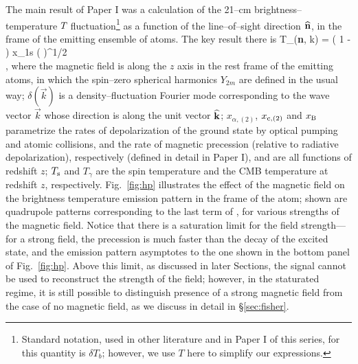 The main result of Paper I was a calculation of the 21--cm brightness--temperature $T_{\rm }$ fluctuation\footnote{Standard notation, used in other literature and in Paper I of this series, for this quantity is $\delta T_b$; however, we use $T$ here to simplify our expressions.} as a function of the line--of--sight direction ${\bf{\widehat n}}$, in the frame of the emitting ensemble of atoms. The key result there is
\beq
\bga
   T_{\rm }({\bf{\widehat n}}, {{\vec k}}) = \left( 1 -  \right) x_{1{\rm s}} \left(  \right)^{1/2} \\
  \times {} \mbox{,} 
\ega
\label{eq:tbsoln}
\eeq
where the magnetic field is along the $z$ axis in the rest frame of the emitting atoms, in which the spin--zero spherical harmonics $Y_{2 m}$ are defined in the usual way; $\delta(\vec k)$ is a density--fluctuation Fourier mode corresponding to the wave vector $\vec k$ whose direction is along the unit vector $\bf{\widehat k}$; $x_{\alpha, (2)}$, $x_{{\rm c}, (2)}$ and $x_{\rm B}$ parametrize the rates of depolarization of the ground state by optical pumping and atomic collisions, and the rate of magnetic precession (relative to radiative depolarization), respectively (defined in detail in Paper I), and are all functions of redshift $z$; $T_{\rm s}$ and $T_\gamma$ are the spin temperature and the CMB temperature at redshift $z$, respectively. Fig.~\ref{fig:hp} illustrates the effect of the magnetic field on the brightness temperature emission pattern in the frame of the atom; shown are quadrupole patterns corresponding to the last term of \eq{\ref{eq:tbsoln}}, for various strengths of the magnetic field. Notice that there is a saturation limit for the field strength---for a strong field, the precession is much faster than the decay of the excited state, and the emission pattern asymptotes to the one shown in the bottom panel of Fig.~\ref{fig:hp}. Above this limit, as discussed in later Sections, the signal cannot be used to reconstruct the strength of the field; however, in the staturated regime, it is still possible to distinguish presence of a strong magnetic field from the case of no magnetic field, as we discuss in detail in \S\ref{sec:fisher}.
